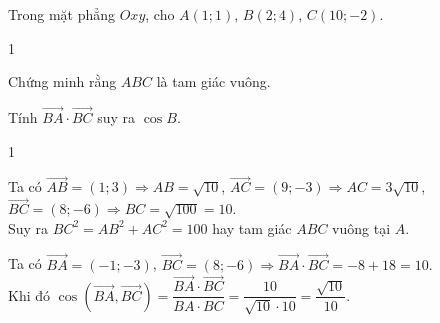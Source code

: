 \begin{bt}%
	Trong mặt phẳng $Oxy$, cho $A(1;1)$, $B(2;4)$, $C(10;-2)$.
	\begin{enumEX}{1}
		\item Chứng minh rằng $ABC$ là tam giác vuông.
		\item Tính $\overrightarrow{BA}\cdot\overrightarrow{BC}$ suy ra $\cos B$.
	\end{enumEX}
	\loigiai
	{
		\begin{enumEX}{1}
			\item Ta có $\overrightarrow{AB}=(1;3)\Rightarrow AB=\sqrt{10}$, $\overrightarrow{AC}=(9;-3)\Rightarrow AC=3\sqrt{10}$, $\overrightarrow{BC}=(8;-6)\Rightarrow BC=\sqrt{100}=10$.\\
			Suy ra $BC^2=AB^2+AC^2=100$ hay tam giác $ABC$ vuông tại $A$.
			\item Ta có $\overrightarrow{BA}=(-1;-3)$, $\overrightarrow{BC}=(8;-6)\Rightarrow \overrightarrow{BA}\cdot \overrightarrow{BC}=-8+18=10.$\\
			Khi đó $\cos(\overrightarrow{BA},\overrightarrow{BC})=\dfrac{\overrightarrow{BA}\cdot\overrightarrow{BC}}{BA\cdot BC}=\dfrac{10}{\sqrt{10}\cdot 10}=\dfrac{\sqrt{10}}{10}$.
		\end{enumEX}
	}
\end{bt}

